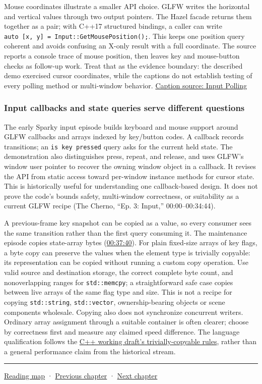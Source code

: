 Mouse coordinates illustrate a smaller API choice. GLFW writes the horizontal and vertical values through two output pointers. The Hazel facade returns them together as a pair; with C++17 structured bindings, a caller can write \texttt{auto\ {[}x,\ y{]}\ =\ Input::GetMousePosition();}. This keeps one position query coherent and avoids confusing an X-only result with a full coordinate. The source reports a console trace of mouse position, then leaves key and mouse-button checks as follow-up work. Treat that as the evidence boundary: the described demo exercised cursor coordinates, while the captions do not establish testing of every polling method or multi-window behavior. \href{https://www.youtube.com/watch?v=yuhNj8yGDJQ}{Caption source: Input Polling}

\subsubsection{Input callbacks and state queries serve different questions}\label{05-engine-i-ch013-input-callbacks-and-state-queries-serve-different-questions}

The early Sparky input episode builds keyboard and mouse support around GLFW callbacks and arrays indexed by key/button codes. A callback records transitions; an \texttt{is\ key\ pressed} query asks for the current held state. The demonstration also distinguishes press, repeat, and release, and uses GLFW's window user pointer to recover the owning window object in a callback. It revises the API from static access toward per-window instance methods for cursor state. This is historically useful for understanding one callback-based design. It does not prove the code's bounds safety, multi-window correctness, or suitability as a current GLFW recipe (The Cherno, ``Ep. 3: Input,'' 00:00--00:34:44).

A previous-frame key snapshot can be copied as a value, so every consumer sees the same transition rather than the first query consuming it. The maintenance episode copies state-array bytes (\href{https://www.youtube.com/watch?v=CKhGMoTNPOo&t=2260}{00:37:40}). For plain fixed-size arrays of key flags, a byte copy can preserve the values when the element type is trivially copyable: its representation can be copied without running a custom copy operation. Use valid source and destination storage, the correct complete byte count, and nonoverlapping ranges for \texttt{std::memcpy}; a straightforward safe case copies between live arrays of the same flag type and size. This is not a recipe for copying \texttt{std::string}, \texttt{std::vector}, ownership-bearing objects or scene components wholesale. Copying also does not synchronize concurrent writers. Ordinary array assignment through a suitable container is often clearer; choose by correctness first and measure any claimed speed difference. The language qualification follows the \href{https://eel.is/c++draft/basic.types\#basic.types.trivial}{C++ working draft's trivially-copyable rules}, rather than a general performance claim from the historical stream.

\begin{center}\rule{0.5\linewidth}{0.5pt}\end{center}

\hyperref[volume-reading-map]{Reading map} · \hyperref[05-engine-i-ch012]{Previous chapter} · \hyperref[05-engine-i-ch014]{Next chapter}
